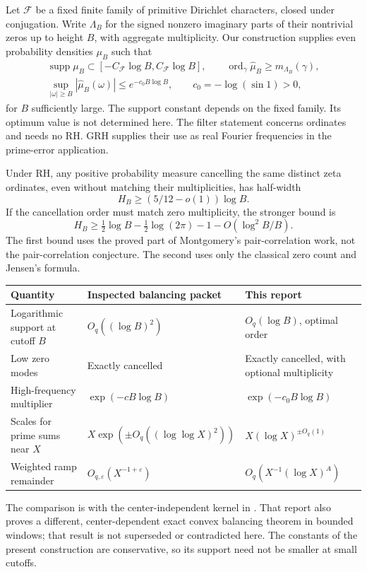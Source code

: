 \documentclass[11pt]{article}
\theoremstyle{remark}\newtheorem{remark}[theorem]{Remark}
\begin{document}
Let $\mathcal F$ be a fixed finite family of primitive Dirichlet characters,
closed under conjugation. Write $\Lambda_B$ for the signed nonzero
imaginary parts of their nontrivial zeros up to height $B$, with aggregate
multiplicity. Our construction supplies even probability densities
$\mu_B$ such that
\begin{equation}\label{eq:intro-main}
\begin{gathered}
 \operatorname{supp}\mu_B\subset[-C_{\mathcal F}\log B,C_{\mathcal F}\log B],
 \qquad \operatorname{ord}_{\gamma}\widehat\mu_B\ge m_{\Lambda_B}(\gamma),\\
 \sup_{|\omega|\ge B}|\widehat\mu_B(\omega)|
       \le e^{-c_0B\log B},\qquad c_0=-\log(\sin1)>0,
\end{gathered}
\end{equation}
for $B$ sufficiently large. The support constant depends on the fixed
family. Its optimum value is not determined here.
The filter statement concerns ordinates and needs no RH. GRH supplies
their use as real Fourier frequencies in the prime-error application.

Under RH, any positive probability measure cancelling the same distinct zeta
ordinates, even without matching their multiplicities, has half-width
\[
 H_B\ge(5/12-o(1))\log B.
\]
If the cancellation order must match zero multiplicity, the stronger bound is
\[
 H_B\ge\tfrac12\log B-\tfrac12\log(2\pi)-1
             -O(\log^2 B/B).
\]
The first bound uses the proved part of Montgomery's pair-correlation
work, not the pair-correlation conjecture. The second uses only the
classical zero count and Jensen's formula.

\begin{center}
\small
\begin{tabular}{@{}p{}p{}p{}@{}}
\toprule
Quantity & Inspected balancing packet & This report\\
\midrule
Logarithmic support at cutoff $B$ & $O_q((\log B)^2)$ & $O_q(\log B)$, optimal order\\[3pt]
Low zero modes & Exactly cancelled & Exactly cancelled, with optional multiplicity\\[3pt]
High-frequency multiplier & $\exp(-cB\log B)$ & $\exp(-c_0B\log B)$\\[3pt]
Scales for prime sums near $X$ & $X\exp(\pm O_q((\log\log X)^2))$ & $X(\log X)^{\pm O_q(1)}$\\[3pt]
Weighted ramp remainder & $O_{q,\varepsilon}(X^{-1+\varepsilon})$ & $O_q(X^{-1}(\log X)^A)$\\
\bottomrule
\end{tabular}
\end{center}
The comparison is with the center-independent kernel in
\cite{priorbalance}. That report also proves a different, center-dependent
exact convex balancing theorem in bounded windows; that result is not
superseded or contradicted here. The constants of the present construction
are conservative, so its support need not be smaller at small cutoffs.
\end{document}
